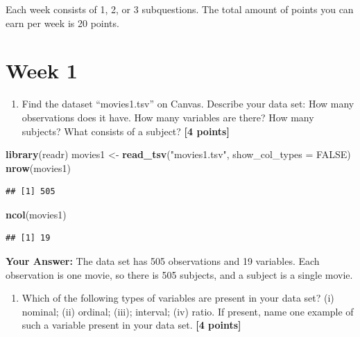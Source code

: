 \documentclass[
]{article}
\newenvironment{Shaded}{\begin{snugshade}}{\end{snugshade}}
\newcommand{\AttributeTok}[1]{\textcolor[rgb]{0.13,0.29,0.53}{#1}}
\newcommand{\ConstantTok}[1]{\textcolor[rgb]{0.56,0.35,0.01}{#1}}
\newcommand{\FunctionTok}[1]{\textcolor[rgb]{0.13,0.29,0.53}{\textbf{#1}}}
\newcommand{\NormalTok}[1]{#1}
\newcommand{\OtherTok}[1]{\textcolor[rgb]{0.56,0.35,0.01}{#1}}
\newcommand{\StringTok}[1]{\textcolor[rgb]{0.31,0.60,0.02}{#1}}
\providecommand{\tightlist}{%
  \setlength{\itemsep}{0pt}\setlength{\parskip}{0pt}}
\begin{document}
Each week consists of 1, 2, or 3 subquestions. The total amount of
points you can earn per week is 20 points.

\section{Week 1}\label{week-1}

\begin{enumerate}
\def\labelenumi{\arabic{enumi}.}
\tightlist
\item
  Find the dataset ``movies1.tsv'' on Canvas. Describe your data set:
  How many observations does it have. How many variables are there? How
  many subjects? What consists of a subject? \textbf{[4 points]}
\end{enumerate}

\begin{Shaded}
\begin{Highlighting}[]
\FunctionTok{library}\NormalTok{(readr)}
\NormalTok{movies1 }\OtherTok{\textless{}{-}} \FunctionTok{read\_tsv}\NormalTok{(}\StringTok{"movies1.tsv"}\NormalTok{, }\AttributeTok{show\_col\_types =} \ConstantTok{FALSE}\NormalTok{)}
\FunctionTok{nrow}\NormalTok{(movies1)}
\end{Highlighting}
\end{Shaded}

\begin{verbatim}
## [1] 505
\end{verbatim}

\begin{Shaded}
\begin{Highlighting}[]
\FunctionTok{ncol}\NormalTok{(movies1)}
\end{Highlighting}
\end{Shaded}

\begin{verbatim}
## [1] 19
\end{verbatim}

\textbf{Your Answer:} The data set has 505 observations and 19
variables. Each observation is one movie, so there is 505 subjects, and
a subject is a single movie.

\begin{enumerate}
\def\labelenumi{\arabic{enumi}.}
\setcounter{enumi}{1}
\tightlist
\item
  Which of the following types of variables are present in your data
  set? (i) nominal; (ii) ordinal; (iii); interval; (iv) ratio. If
  present, name one example of such a variable present in your data set.
  \textbf{[4 points]}
\end{enumerate}
\end{document}
